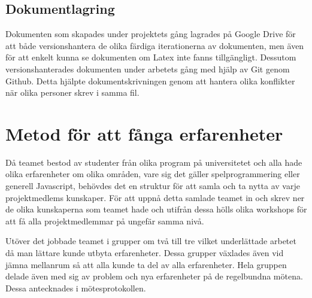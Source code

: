 \subsection{Dokumentlagring}
Dokumenten som skapades under projektets gång lagrades på Google Drive för att både versionshantera de olika färdiga iterationerna av dokumenten, men även för att enkelt kunna se dokumenten om Latex inte fanns tillgängligt. Dessutom versionshanterades dokumenten under arbetets gång med hjälp av Git genom Github. Detta hjälpte dokumentskrivningen genom att hantera olika konflikter när olika personer skrev i samma fil.

\section{Metod för att fånga erfarenheter}
Då teamet bestod av studenter från olika program på universitetet och alla hade olika erfarenheter om olika områden, vare sig det gäller spelprogrammering eller generell Javascript, behövdes det en struktur för att samla och ta nytta av varje projektmedlems kunskaper. För att uppnå detta samlade teamet in och skrev ner de olika kunskaperna som teamet hade och utifrån dessa hölls olika workshops för att få alla projektmedlemmar på ungefär samma nivå.

Utöver det jobbade teamet i grupper om två till tre vilket underlättade arbetet då man lättare kunde utbyta erfarenheter. Dessa grupper växlades även vid jämna mellanrum så att alla kunde ta del av alla erfarenheter. Hela gruppen delade även med sig av problem och nya erfarenheter på de regelbundna mötena. Dessa antecknades i mötesprotokollen.
